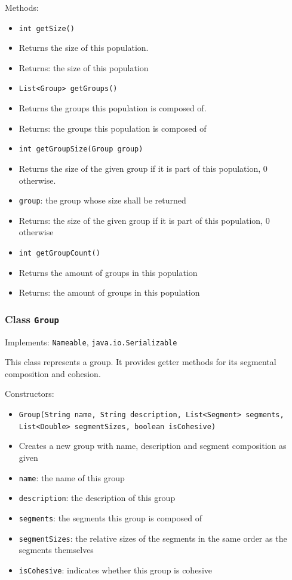 \documentclass[parskip=full,11pt]{scrartcl}
\begin{document}
Methods:
\begin{itemize}\itemsep -10pt
\item \texttt{int getSize()}
\item[] Returns the size of this population.
\item[] Returns: the size of this population

\item \texttt{List<Group> getGroups()}
\item[] Returns the groups this population is composed of.
\item[] Returns: the groups this population is composed of

\item \texttt{int getGroupSize(Group group)}
\item[] Returns the size of the given group if it is part of this population, \(0\) otherwise.
\item[] \texttt{group}: the group whose size shall be returned
\item[] Returns: the size of the given group if it is part of this population, \(0\) otherwise

\item \texttt{int getGroupCount()}
\item[] Returns the amount of groups in this population
\item[] Returns: the amount of groups in this population
\end{itemize}

\subsubsection{Class \texttt{Group}}
Implements: \texttt{Nameable}, \texttt{java.io.Serializable}

This class represents a group. It provides getter methods for its segmental composition and cohesion.

Constructors:
\begin{itemize}\itemsep -10pt
\item \texttt{Group(String name, String description, List<Segment> segments, List<Double> segmentSizes, boolean isCohesive)}
\item[] Creates a new group with name, description and segment composition as given
\item[] \texttt{name}: the name of this group
\item[] \texttt{description}: the description of this group
\item[] \texttt{segments}: the segments this group is composed of
\item[] \texttt{segmentSizes}: the relative sizes of the segments in the same order as the segments themselves
\item[] \texttt{isCohesive}: indicates whether this group is cohesive
\end{itemize}
\end{document}
